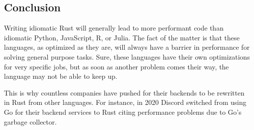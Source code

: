 \begin{multicols}{2}

\section{Conclusion}
Writing idiomatic Rust will generally lead to more performant code than idiomatic Python, JavaScript, R, or Julia. The fact
of the matter is that these languages, as optimized as they are, will always have a barrier in performance for solving
general purpose tasks. Sure, these languages have their own optimizations for very specific jobs, but as soon as another
problem comes their way, the language may not be able to keep up.

This is why countless companies have pushed for their backends to be rewritten in Rust from other languages. For instance,
in 2020 Discord switched from using Go for their backend services to Rust citing performance problems due to Go's garbage
collector.~\cite{discord}

\end{multicols}
